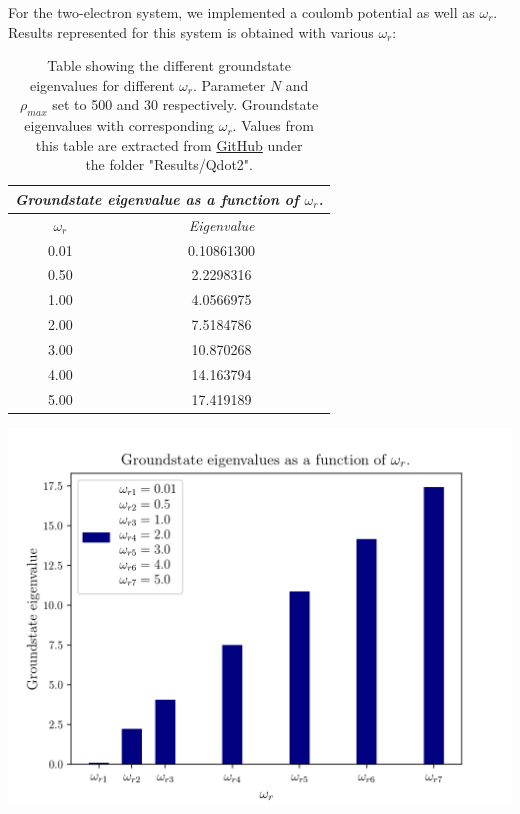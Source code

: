 \documentclass[twoside,onecolumn]{article}
\begin{document}
For the two-electron system, we implemented a coulomb potential as well as $\omega_r$. Results represented for this system is obtained with various $\omega_r$: 


\begin{table}[H]
	\hspace{-0.9cm}\begin{minipage}{0.5\linewidth}
		\centering
		\vspace{-0.15\textwidth}
		\captionsetup{skip=10pt, width=1.0\linewidth}
		\caption{Table showing the different groundstate \\ 
				eigenvalues for different $\omega_r$. Parameter $N$ and \\ 
				$\rho_{max}$ set to 500 and 30 respectively. Groundstate\\
				eigenvalues with corresponding $\omega_r$. Values from\\
				 this table are extracted from \textcolor{red}{\href{https://github.com/patrykpk/FYS4150/tree/master/Project_2}{GitHub}} under\\ 
				 the folder "Results/Qdot2".}
		\label{tab:Qdot2}
		\begin{tabular}{|c|c|}
			\hline
			\multicolumn{2}{|c|}{\textit{\textbf{Groundstate eigenvalue as a function of $\omega_r$.}}} \\ \hline
			$\omega_r$ & \textit{Eigenvalue}  \\ \hline
			0.01 & 0.10861300   \\ \hline
			0.50 & 2.2298316   \\ \hline
			1.00 & 4.0566975   \\ \hline
			2.00 & 7.5184786 \\ \hline
			3.00 & 10.870268 \\ \hline
			4.00 & 14.163794  \\ \hline
			5.00 & 17.419189 \\ \hline
		\end{tabular}
	\end{minipage}\hfill
	\begin{minipage}{0.6\linewidth}
		\vspace{0.2\textwidth}
		\centering
		\includegraphics[scale = 0.65]{Figure_5_Project_2.png}

\end{minipage}
\end{table}
\end{document}
